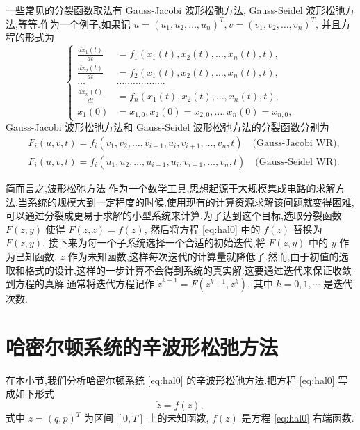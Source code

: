 一些常见的分裂函数取法有 Gauss-Jacobi 波形松弛方法, Gauss-Seidel 波形松弛方法,等等.作为一个例子,如果记 $u=(u_{1},u_{2},\ldots,u_{n})^{T}, v=(v_{1},v_{2},\ldots,v_{n})^{T}$, 并且方程的形式为
\begin{equation*}
\left\{
\begin{aligned}
\frac{dx_{1}(t)}{dt}&=f_{1}(x_{1}(t),x_{2}(t),\ldots,x_{n}(t),t),\\
\frac{dx_{2}(t)}{dt}&=f_{2}(x_{1}(t),x_{2}(t),\ldots,x_{n}(t),t),\\
\ldots&\ldots\ldots\ldots\ldots\ldots\ldots\\
\frac{dx_{n}(t)}{dt}&=f_{n}(x_{1}(t),x_{2}(t),\ldots,x_{n}(t),t),\\
x_{1}(0)&=x_{1,0},x_{2}(0)=x_{2,0},\ldots,x_{n}(0)=x_{n,0},
\end{aligned}
\right.
\end{equation*}
Gauss-Jacobi 波形松弛方法和 Gauss-Seidel 波形松弛方法的分裂函数分别为
\begin{align}\label{eq:wr}
&F_{i}(u,v,t)=f_{i}(v_{1},v_{2},\ldots,v_{i-1},u_{i},v_{i+1},\ldots,v_{n},t)\quad \text{(Gauss-Jacobi~WR)},\\
&F_{i}(u,v,t)=f_{i}(u_{1},u_{2},\ldots,u_{i-1},u_{i},v_{i+1},\ldots,v_{n},t)\quad \text{(Gauss-Seidel~WR)}.
\end{align}

简而言之,波形松弛方法 \cite{jiang2009wr} 作为一个数学工具,思想起源于大规模集成电路的求解方法.当系统的规模大到一定程度的时候,使用现有的计算资源求解该问题就变得困难,可以通过分裂成更易于求解的小型系统来计算.为了达到这个目标,选取分裂函数 $F(z,y)$ 使得 $F(z,z)=f(z)$, 然后将方程 \eqref{eq:hal0} 中的 $f(z)$ 替换为 $F(z,y)$. 接下来为每一个子系统选择一个合适的初始迭代,将 $F(z,y)$ 中的 $y$ 作为已知函数, $z$ 作为未知函数,这样每次迭代的计算量就降低了.然而,由于初值的选取和格式的设计,这样的一步计算不会得到系统的真实解.这要通过迭代来保证收敛到方程的真解.通常将迭代方程记作 $\dot{z}^{k+1}=F(z^{k+1},z^{k})$, 其中 $k=0,1,\cdots$ 是迭代次数.


\section{哈密尔顿系统的辛波形松弛方法}\label{sec:03wrhal}
在本小节,我们分析哈密尔顿系统 \eqref{eq:hal0} 的辛波形松弛方法.把方程 \eqref{eq:hal0} 写成如下形式
\begin{equation}\label{eq:hal1}
\dot{z}=f(z),
\end{equation}
式中 $z=(q,p)^T$ 为区间 $[0,T]$ 上的未知函数, $f(z)$ 是方程 \eqref{eq:hal0} 右端函数.

